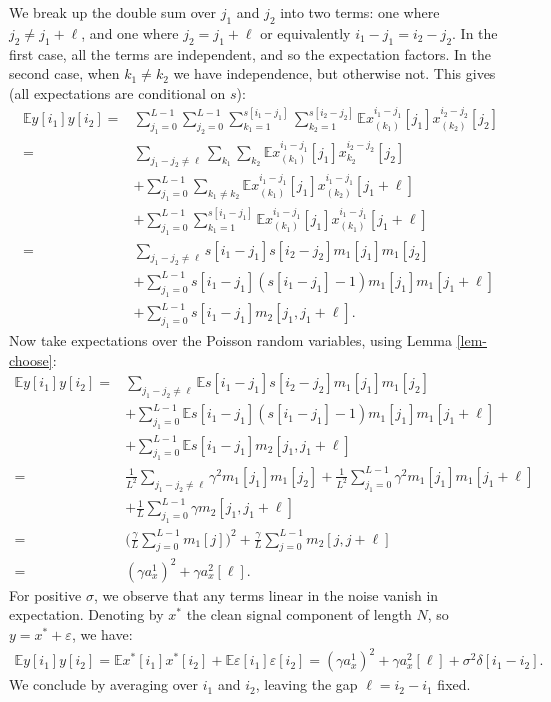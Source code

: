 \documentclass[12pt]{article}
\newcommand{\E}{\mathbb{E}}
\newcommand{\ep}{\varepsilon}
\newcommand{\1}{\mathbf{1}}
\newcommand{\M}{m}
\theoremstyle{plain}
\theoremstyle{definition}
\theoremstyle{remark}
\theoremstyle{plain}
\theoremstyle{remark}
\theoremstyle{plain}
\theoremstyle{plain}
\theoremstyle{plain}
\numberwithin{equation}{section}
\begin{document}
We break up the double sum over $j_1$ and $j_2$ into two terms: one where $j_2 \ne j_1 + \ell$, and one where $j_2 = j_1 + \ell$ or equivalently $i_1-j_1 = i_2-j_2$. In the first case, all the terms are independent, and so the expectation factors. In the second case, when $k_1 \ne k_2$ we have independence, but otherwise not. This gives (all expectations are conditional on $s$):
%
\begin{align} \label{moment2-condm}
%
\E y[i_1] y[i_2]
=& \sum_{j_1=0}^{L-1} \sum_{j_2=0}^{L-1} 
\sum_{k_1=1}^{s[i_1-j_1]}\sum_{k_2=1}^{s[i_2-j_2]}
\E x_{(k_1)}^{i_1-j_1}[j_1] x_{(k_2)}^{i_2 - j_2}[j_2]
\nonumber \\
=& \sum_{j_1 - j_2 \ne \ell} \sum_{k_1} 
\sum_{k_2} \E x_{(k_1)}^{i_1-j_1}[j_1] x_{k_2}^{i_2 - j_2}[j_2]
\nonumber \\
& + \sum_{j_1 = 0}^{L-1} \sum_{k_1 \ne k_2} 
\E x_{(k_1)}^{i_1-j_1}[j_1] x_{(k_2)}^{i_1 - j_1}[j_1+\ell]
\nonumber \\
& + \sum_{j_1 = 0}^{L-1} \sum_{k_1=1}^{s[i_1-j_1]} 
\E x_{(k_1)}^{i_1-j_1}[j_1] x_{(k_1)}^{i_1-j_1}[j_1 + \ell] 
\nonumber \\
=& \sum_{j_1 - j_2 \ne \ell} s[i_1-j_1] s[i_2 - j_2] \M_1[j_1] \M_1[j_2]
\nonumber \\
& + \sum_{j_1 = 0}^{L-1} s[i_1-j_1](s[i_1-j_1] - 1) \M_1[j_1] \M_1[j_1 + \ell]
\nonumber \\
& + \sum_{j_1 = 0}^{L-1} s[i_1-j_1] \M_2[j_1,j_1 + \ell] .
%
\end{align}
%
Now take expectations over the Poisson random variables, using Lemma \ref{lem-choose}:
%
\begin{align}
%
\E y[i_1] y[i_2]
=& \sum_{j_1 - j_2 \ne \ell} \E s[i_1-j_1] s[i_2 - j_2] \M_1[j_1] \M_1[j_2]
\nonumber \\
&       + \sum_{j_1 = 0}^{L-1} \E s[i_1-j_1](s[i_1-j_1] - 1) \M_1[j_1] \M_1[j_1 + \ell]
\nonumber \\
&       + \sum_{j_1 = 0}^{L-1} \E s[i_1-j_1] \M_2[j_1,j_1 + \ell]
\nonumber \\
=& \frac{1}{L^2}\sum_{j_1 - j_2 \ne \ell} \gamma^2 \M_1[j_1] \M_1[j_2]
+ \frac{1}{L^2} \sum_{j_1 = 0}^{L-1} \gamma^2 \M_1[j_1] \M_1[j_1 + \ell]
\nonumber \\
&       + \frac{1}{L}\sum_{j_1 = 0}^{L-1} \gamma \M_2[j_1,j_1 + \ell]
\nonumber \\
=&  \bigg(\frac{\gamma}{L}  \sum_{j = 0}^{L-1} \M_1[j] \bigg)^2
+ \frac{\gamma}{L} \sum_{j = 0}^{L-1} \M_2[j,j + \ell]
\nonumber \\
=&  (\gamma a_x^1)^2 + \gamma a_x^2[\ell].
%
\end{align}
%
For positive $\sigma$, we observe that any terms linear in the noise vanish in expectation. Denoting by $x^*$ the clean signal component of length $N$, so $y = x^* + \ep$, we have:
%
%
\begin{align}
\E y[i_1] y[i_2] = \E x^*[i_1] x^*[i_2] + \E \ep[i_1] \ep[i_2]
= (\gamma a_x^1)^2 + \gamma a_x^2[\ell] + \sigma^2 \delta[i_1 - i_2].
\end{align}
%
We conclude by averaging over $i_1$ and $i_2$, leaving the gap $\ell = i_2 - i_1$ fixed.
\end{document}

